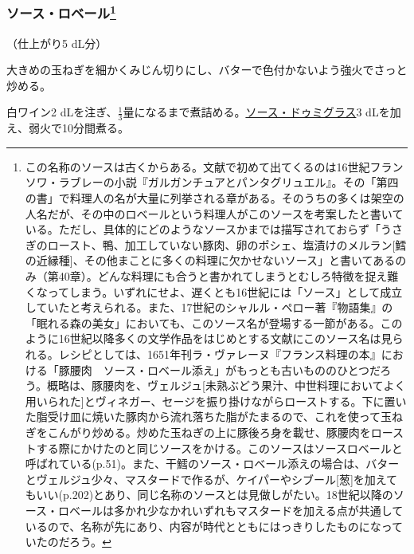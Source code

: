 \begin{recette}
{\subsubsection[ソース・ロベール]{\texorpdfstring{ソース・ロベール\footnote{この名称のソースは古くからある。文献で初めて出てくるのは16世紀フランソワ・ラブレーの小説『ガルガンチュアとパンタグリュエル』。その「第四の書」で料理人の名が大量に列挙される章がある。そのうちの多くは架空の人名だが、その中のロベールという料理人がこのソースを考案したと書いている。ただし、具体的にどのようなソースかまでは描写されておらず「うさぎのロースト、鴨、加工していない豚肉、卵のポシェ、塩漬けのメルラン{[}鱈の近縁種{]}、その他まことに多くの料理に欠かせないソース」と書いてあるのみ（第40章）。どんな料理にも合うと書かれてしまうとむしろ特徴を捉え難くなってしまう。いずれにせよ、遅くとも16世紀には「ソース」として成立していたと考えられる。また、17世紀のシャルル・ペロー著『物語集』の「眠れる森の美女」においても、このソース名が登場する一節がある。このように16世紀以降多くの文学作品をはじめとする文献にこのソース名は見られる。レシピとしては、1651年刊ラ・ヴァレーヌ『フランス料理の本』における「豚腰肉　ソース・ロベール添え」がもっとも古いもののひとつだろう。概略は、豚腰肉を、ヴェルジュ{[}未熟ぶどう果汁、中世料理においてよく用いられた{]}とヴィネガー、セージを振り掛けながらローストする。下に置いた脂受け皿に焼いた豚肉から流れ落ちた脂がたまるので、これを使って玉ねぎをこんがり炒める。炒めた玉ねぎの上に豚後ろ身を載せ、豚腰肉をローストする際にかけたのと同じソースをかける。このソースはソースロベールと呼ばれている(p.51)。また、干鱈のソース・ロベール添えの場合は、バターとヴェルジュ少々、マスタードで作るが、ケイパーやシブール{[}葱{]}を加えてもいい(p.202)とあり、同じ名称のソースとは見做しがたい。18世紀以降のソース・ロベールは多かれ少なかれいずれもマスタードを加える点が共通しているので、名称が先にあり、内容が時代とともにはっきりしたものになっていたのだろう。}}{ソース・ロベール}}\label{sauce-robert}}



（仕上がり5 dL分）

大きめの玉ねぎを細かくみじん切りにし、バターで色付かないよう強火でさっと炒める。

白ワイン2
dLを注ぎ、\(\frac{1}{3}\)量になるまで煮詰める。\protect\hyperlink{sauce-demi-glace}{ソース・ドゥミグラス}3
dLを加え、弱火で10分間煮る。


\end{recette}
